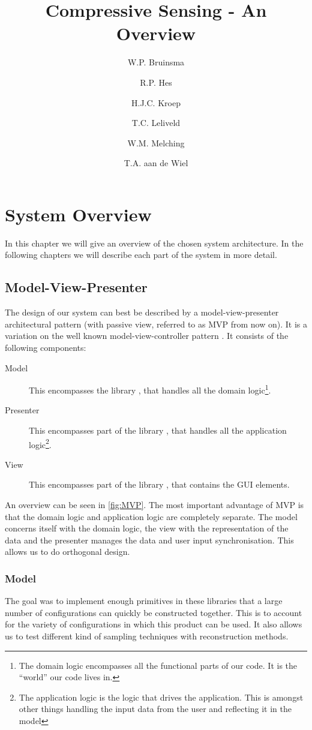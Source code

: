 \documentclass[a4paper, openany, oneside]{memoir}
\title{Compressive Sensing - An Overview}
\author{W.P. Bruinsma \and R.P. Hes \and H.J.C. Kroep \and T.C. Leliveld \and W.M. Melching \and T.A. aan de Wiel}
\begin{document}
\chapter{System Overview}
In this chapter we will give an overview of the chosen system architecture. In the following chapters we will describe each part of the system in more detail.

\section{Model-View-Presenter}
\label{sec:model-view-presenter}
The design of our system can best be described by a model-view-presenter architectural pattern (with passive view, referred to as MVP from now on). It is a variation on the well known model-view-controller pattern \cite{syromiatnikov2014journey}. It consists of the following components:
\begin{description}
    \item[Model] This encompasses the library , that handles all the domain logic\footnote{The domain logic encompasses all the functional parts of our code. It is the ``world'' our code lives in.}.
    \item[Presenter] This encompasses part of the library , that handles all the application logic\footnote{The application logic is the logic that drives the application. This is amongst other things handling the input data from the user and reflecting it in the model}.
    \item[View] This encompasses part of the library , that contains the GUI elements.
\end{description}
An overview can be seen in \cref{fig:MVP}. The most important advantage of MVP is that the domain logic and application logic are completely separate. The model concerns itself with the domain logic, the view with the representation of the data and the presenter manages the data and user input synchronisation. This allows us to do orthogonal design.

\begin{figure*}
    \centering
    
    \caption{Illustration of the MVP pattern as an hierarchical way of separating our system.}
    \label{fig:MVP}
\end{figure*}

\subsection{Model}
\label{sub:model}
The goal was to implement enough primitives in these libraries that a large number of configurations can quickly be constructed together. This is to account for the variety of configurations in which this product can be used. It also allows us to test different kind of sampling techniques with reconstruction methods.
\end{document}
